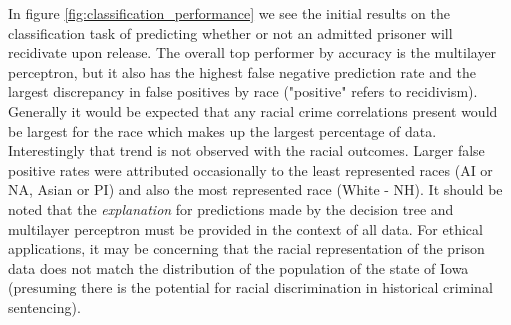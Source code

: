 \documentclass[sigconf]{acmart}
\begin{document}
In figure \ref{fig:classification_performance} we see the initial results on the classification task of predicting whether or not an admitted prisoner will recidivate upon release. The overall top performer by accuracy is the multilayer perceptron, but it also has the highest false negative prediction rate and the largest discrepancy in false positives by race ("positive" refers to recidivism). Generally it would be expected that any racial crime correlations present would be largest for the race which makes up the largest percentage of data. Interestingly that trend is not observed with the racial outcomes. Larger false positive rates were attributed occasionally to the least represented races (AI or NA, Asian or PI) and also the most represented race (White - NH). It should be noted that the \textit{explanation} for predictions made by the decision tree and multilayer perceptron must be provided in the context of all data. For ethical applications, it may be concerning that the racial representation of the prison data does not match the distribution of the population of the state of Iowa (presuming there is the potential for racial discrimination in historical criminal sentencing).
\end{document}
